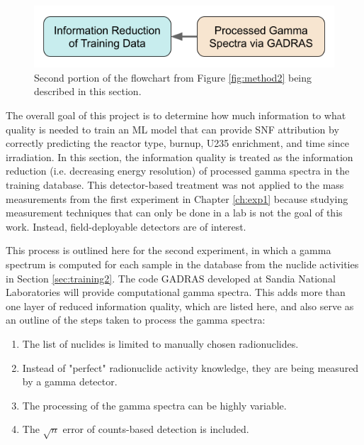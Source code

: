 
\begin{figure}[H]
  \centering
  \includegraphics[width=0.7\linewidth]{./chapters/exp2/methodology2_2.png}
  \caption[Second portion of the flowchart from Figure \ref{fig:method2}]
          {Second portion of the flowchart from Figure \ref{fig:method2} being 
           described in this section.}
\end{figure}

The overall goal of this project is to determine how much information to what
quality is needed to train an  \gls{ML}
model that can provide \gls{SNF} attribution by correctly predicting the
reactor type, burnup, \gls{U235} enrichment, and time since irradiation.  In
this section, the information quality is treated as the information reduction
(i.e. decreasing energy resolution) of processed gamma spectra in the training
database.  This detector-based treatment was not applied to the mass
measurements from the first experiment in Chapter \ref{ch:exp1} because
studying measurement techniques that can only be done in a lab is not the goal
of this work.  Instead, field-deployable detectors are of interest.

This process is outlined here for the second experiment, in which a gamma
spectrum is computed for each sample in the database from the nuclide
activities in Section \ref{sec:training2}.  The code \gls{GADRAS} \cite{gadras}
developed at Sandia National Laboratories will provide computational gamma
spectra.  This adds more than one layer of reduced information quality, which
are listed here, and also serve as an outline of the steps taken to process the 
gamma spectra:
\begin{enumerate}
  \item \label{itm:1} The list of nuclides is limited to manually chosen 
        radionuclides.
  \item \label{itm:2} Instead of "perfect" radionuclide activity knowledge, 
        they are being measured by a gamma detector.
  \item \label{itm:3} The processing of the gamma spectra can be highly variable.
  \item \label{itm:4} The $\sqrt{n}$ error of counts-based detection is included. 
\end{enumerate}

